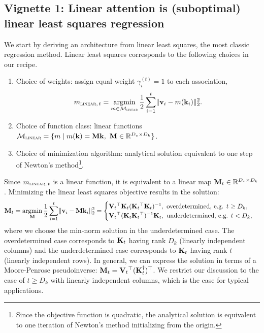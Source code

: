 \documentclass[notitlepage, 11pt]{article}
\newcommand*{\memory}{{m}}
\newcommand*{\dkey}{{D_k}}
\newcommand*{\dval}{{D_v}}
\newcommand*{\linearfunctions}{{\Mcal_{\textsc{linear}}}}
\begin{document}
\subsection*{Vignette 1: Linear attention is (suboptimal) linear least squares regression}
We start by deriving an architecture from linear least squares, the most classic regression method.
Linear least squares corresponds to the following choices in our recipe.
\begin{enumerate}
    \item Choice of weights: assign equal weight $\gamma_i^{(t)} = 1$ to each association,  \begin{align}\memory_{\textsc{linear},\,t} = \argmin_{\memory\in \linearfunctions} \frac{1}{2}\sum_{i=1}^t \norm{\vbf_i - \memory(\kbf_i)}_2^2.\label{eqn:linear-least-squares}\end{align}
    \item Choice of function class: linear functions $\linearfunctions = \{\memory\mid \memory(\kbf) = \Mbf \kbf,\ \Mbf \in \reals^{\dval\times\dkey}\}$.
    \item Choice of minimization algorithm: analytical solution equivalent to one step of Newton's method\footnote{Since the objective function is quadratic, the analytical solution is equivalent to one iteration of Newton's method initializing from the origin.}.
\end{enumerate}
Since $\memory_{\textsc{linear},\,t}$ is a linear function, it is equivalent to a linear map $\Mbf_t\in \reals^{\dval\times\dkey}$.
Minimizing the linear least squares objective results in the solution:
\begin{align}
\Mbf_t = \argmin_{\Mbf} \frac{1}{2}\sum_{i=1}^t \norm{\vbf_i - \Mbf\kbf_i}_2^2
    =\begin{cases}
        \Vbf_t\transpose \Kbf_t(\Kbf_t\transpose\Kbf_t)\inverse, \ \text{overdetermined, e.g. } t \geq \dkey, \label{eqn:ols}\\%
        \Vbf_t\transpose (\Kbf_t\Kbf_t\transpose)\inverse\Kbf_t, \ \text{underdetermined, e.g. } t < \dkey, %
    \end{cases}
\end{align}
where we choose the min-norm solution in the underdetermined case.
The overdetermined case corresponds to $\mathbf{K}_t$ having rank $\dkey$ (linearly independent columns) and the underdetermined case corresponds to $\mathbf{K}_t$ having rank $t$ (linearly independent rows).
In general, we can express the solution in terms of a Moore-Penrose pseudoinverse: $\mathbf{M}_t = \mathbf{V}_t{}^\top(\mathbf{K}_t^{\dagger}){}^\top$.
We restrict our discussion to the case of $t \geq \dkey$ with linearly independent columns, which is the case for typical applications.
\end{document}
